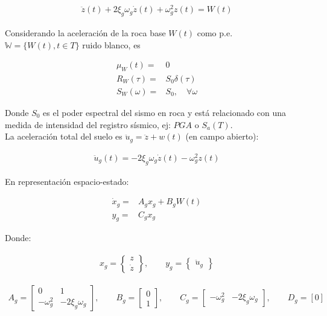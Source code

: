 \begin{align*}
    \ddot{z}(t) +2\xi_g\omega_g \dot{z}(t) +\omega_g^2 z(t) = W(t) 
\end{align*}

Considerando la aceleración de la roca base $W(t)$ como p.e. $\mathbb{W} = \{W(t), t \in T\}$ ruido blanco, es 

\begin{align*}
    \mu_W(t) =& 0 \\
    R_W(\tau) =& S_0 \delta(\tau) \\
    S_W(\omega) =& S_0, \quad \forall \omega
\end{align*}

Donde $S_0$ es el poder espectral del sismo en roca y está relacionado con una medida de intensidad del registro sísmico, ej: $PGA$ o $S_a(T)$.\\

La aceleración total del suelo es  $\ddot{u}_{g} = \ddot{z} + w(t)$ (en campo abierto):

\begin{align*}
    \ddot{u}_g(t) = -2\xi_g\omega_g \dot{z}(t) - \omega_g^2 z(t)
\end{align*}

En representación espacio-estado:

\begin{align*}
    \dot{x}_g =& {A}_g{x}_g+{B}_g W(t) \\
    {y}_g =& {C}_g{x}_g
\end{align*}

Donde:

\begin{align*}
    {x_g} = \begin{Bmatrix}
        z \\
        \dot{z}
    \end{Bmatrix}, \qquad
    y_g = \begin{Bmatrix}
        \ddot{u}_g
    \end{Bmatrix}
\end{align*}

\begin{align*}
    {A}_g = \begin{bmatrix}
        0 & 1 \\
        -\omega_g^2  & -2\xi_g\omega_g
    \end{bmatrix}, \qquad
    {B}_g = \begin{bmatrix}
        0 \\
        1
    \end{bmatrix}, \qquad
    {C}_g = \begin{bmatrix}
        -\omega_g^2 & -2\xi_g\omega_g
    \end{bmatrix}, \qquad
    {D}_g = [0]
\end{align*}

